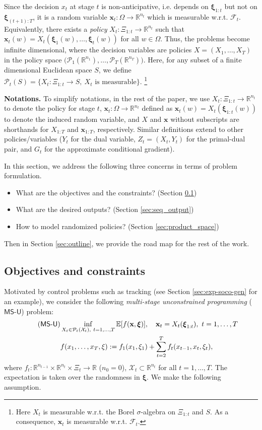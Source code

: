 \documentclass[11pt,fullpage,letterpaper]{article}
\newcommand{\mc}{\mathcal}
\newcommand{\mb}{\mathbf}
\newcommand{\R}{\mathbb{R}}
\newcommand{\E}{\mathbb{E}}
\newcommand{\bx}{\boldsymbol{\xi}}
\newcommand{\msup}{$\mathsf{MS}$-$\mathsf{U}$}
\begin{document}
Since the decision $x_t$ at stage $t$ is non-anticipative, i.e. depends on $\bx_{1:t}$ but not on $\bx_{(t+1):T}$, it is a random variable $\mb x_t:\Omega\to \R^{n_t}$ which is measurable w.r.t. $\mc F_t$. Equivalently, there exists a \textit{policy} $X_t: \Xi_{1:t}\to \R^{n_t}$ such that $\mb x_t(w) = X_t(\bx_1(w),\ldots,\bx_t(w))$ for all $w\in \Omega$. Thus, the problems become infinite dimensional, where the decision variables are policies $X = (X_1,\ldots,X_T)$ in the policy space $ \mc (\mc P_1(\R^{n_1}),\ldots,\mc P_T(\R^{n_T}))$. Here, for any subset of a finite dimensional Euclidean space $S$, we define $\mc P_t(S) = \{X_t:\Xi_{1:t}\to S,~X_t \text{ is measurable}\}$. \footnote{Here $X_t$ is measurable w.r.t. the Borel $\sigma$-algebra on $\Xi_{1:t}$ and $S$. As a consequence, $\mb x_t$ is measurable w.r.t. $\mc F_t$.}

\textbf{Notations.} To simplify notations, in the rest of the paper, we use $X_t:\Xi_{1:t} \to \R^{n_t}$ to denote the policy for stage $t$, $\mb x_t:\Omega\to \R^{n_t}$ defined as $\mb x_t(w) = X_t(\bx_{1:t}(w))$ to denote the induced random variable, and $X$ and $\mb x$ without subscripts are shorthands for $X_{1:T}$ and $\mb x_{1:T}$, respectively. Similar definitions extend to other policies/variables ($Y_t$ for the dual variable, $Z_t =(X_t,Y_t)$ for the primal-dual pair, and $G_t$ for the approximate conditional gradient). 

In this section, we address the following three concerns in terms of problem formulation.
\begin{itemize}
    \item What are the objectives and the constraints? (Section \ref{sec:obj_cons})
    \item What are the desired outputs? (Section \ref{sec:seq_output})
    \item How to model randomized policies? (Section \ref{sec:product_space})
\end{itemize}
Then in Section \ref{sec:outline}, we provide the road map for the rest of the work.


\subsection{Objectives and constraints}\label{sec:obj_cons}

Motivated by control problems such as tracking (see Section \ref{sec:exp-soco-gen} for an example), we consider the following \textit{multi-stage unconstrained programming} (\msup) problem: 
\begin{align}\label{eq:obj_unconstrained-online}\tag{\msup}
   & \inf_{X_t\in \mc P_t(\mc X_t),~t=1,\ldots,T} \E[f(\mb x,\bx)],\quad \mb x_t = X_t(\bx_{1:t}),~t=1,\ldots,T\\
   & f(x_1,\ldots,x_T,\xi):= f_1(x_1,\xi_1) + \sum_{t=2}^T f_{t}(x_{t-1},x_t,\xi_t), \nonumber
\end{align}
where $f_t:\R^{n_{t-1}}\times \R^{n_t}\times\Xi_t\to \R$ ($n_0 = 0$), $\mc X_t\subset \R^{n_t}$ for all $t=1,\ldots,T$. The expectation is taken over the randomness in $\bx$. We make the following assumption.  
\end{document}
